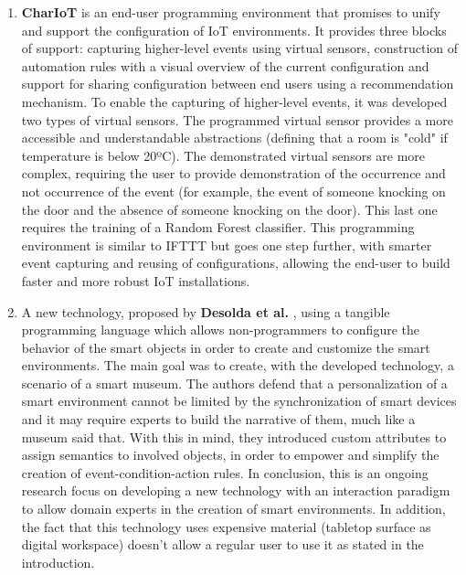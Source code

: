 \begin{enumerate}
    \item \textbf{CharIoT} \cite{chariot} is an end-user programming environment that promises to unify and support the configuration of IoT environments. It provides three blocks of support: capturing higher-level events using virtual sensors, construction of automation rules with a visual overview of the current configuration and support for sharing configuration between end users using a recommendation mechanism. To enable the capturing of higher-level events, it was developed two types of virtual sensors. The programmed virtual sensor provides a more accessible and understandable abstractions (defining that a room is "cold" if temperature is below 20ºC). The demonstrated virtual sensors are more complex, requiring the user to provide demonstration of the occurrence and not occurrence of the event (for example, the event of someone knocking on the door and the absence of someone knocking on the door). This last one requires the training of a Random Forest classifier. This programming environment is similar to IFTTT but goes one step further, with smarter event capturing and reusing of configurations, allowing the end-user to build faster and more robust IoT installations.
    \item A new technology, proposed by \textbf{Desolda et al.} \cite{desolda}, using a tangible programming language which allows non-programmers to configure the behavior of the smart objects in order to create and customize the smart environments. The main goal was to create, with the developed technology, a scenario of a smart museum. The authors defend that a personalization of a smart environment cannot be limited by the synchronization of smart devices and it may require experts to build the narrative of them, much like a museum said that. With this in mind, they introduced custom attributes to assign semantics to involved objects, in order to empower and simplify the creation of event-condition-action rules. In conclusion, this is an ongoing research focus on developing a new technology with an interaction paradigm to allow domain experts in the creation of smart environments. In addition, the fact that this technology uses expensive material (tabletop surface as digital workspace) doesn’t allow a regular user to use it as stated in the introduction.

\end{enumerate}
